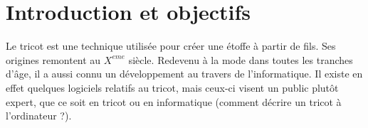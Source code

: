\documentclass{article}
\begin{document}


\newpage

%




\tableofcontents

\newpage

\section{Introduction et objectifs} %

Le tricot est une technique utilisée pour créer une étoffe à partir de fils. Ses origines remontent au $X^{eme}$ siècle.
Redevenu à la mode dans toutes les tranches d'âge, il a aussi connu un développement au travers de l'informatique. Il existe en effet
quelques logiciels relatifs au tricot, mais ceux-ci visent un public plutôt expert, que ce soit en tricot ou en informatique (comment
décrire un tricot à l'ordinateur ?).
\end{document}
